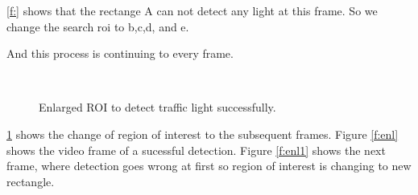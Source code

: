 \ref{f:} shows that the rectange A can not detect any light at this frame.
So we change the search roi to b,c,d, and e. 

And this process is continuing to every frame.

\begin{figure}[!ht]
\centering
{}\\

\caption{Enlarged ROI to detect traffic light successfully.}
\label{f:rec_enl}
\end{figure}

\ref{f:rec_enl} shows the change of region of interest to the subsequent frames.
Figure \ref{f:enl} shows the video frame of a sucessful detection.
Figure \ref{f:enl1} shows the next frame, where detection goes wrong at first so region of interest is changing to new rectangle.


